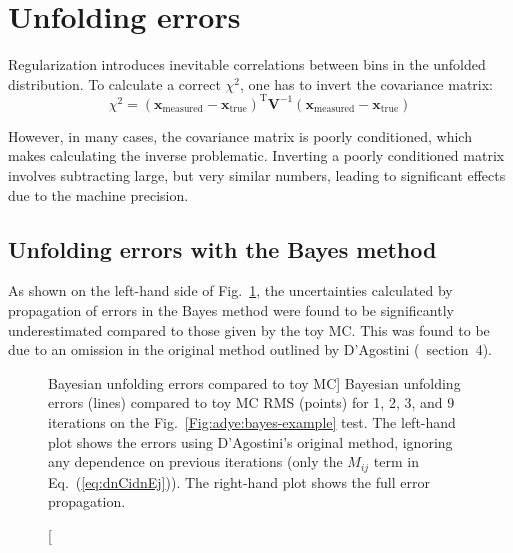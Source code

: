 \documentclass{cernrep}
\begin{document}
\section{Unfolding errors}

Regularization introduces inevitable correlations between bins in the unfolded distribution.
To calculate a correct $\chi^2$, one has to invert the covariance matrix:
\begin{equation}
\chi^2 = (\mathbf{x}_{\mathrm{measured}} - \mathbf{x}_{\mathrm{true}})^{\mathrm{T}} \mathbf{V}^{-1}
         (\mathbf{x}_{\mathrm{measured}} - \mathbf{x}_{\mathrm{true}})
\end{equation}

However, in many cases, the covariance matrix is poorly conditioned,
which makes calculating the inverse problematic.
Inverting a poorly conditioned matrix involves subtracting large, but
very similar numbers, leading to significant effects due to the
machine precision.

\subsection{Unfolding errors with the Bayes method}

As shown on the left-hand side of Fig.~\ref{fig:bayes_errors},
the uncertainties calculated by propagation of errors in the Bayes method
were found to be significantly underestimated compared to those given by the toy MC.
This was found to be due to an omission in the original method
outlined by D'Agostini (\cite{D'Agostini:1994zf}~section~4).%
\begin{figure}
%
\caption
[Bayesian unfolding errors compared to toy MC]%
{Bayesian unfolding errors (lines) compared to toy MC RMS (points) for 1, 2, 3, and 9 iterations
on the Fig.~\ref{Fig:adye:bayes-example} test.
The left-hand plot shows the errors using D'Agostini's original method,
ignoring any dependence on previous iterations (only the $M_{ij}$ term in Eq.~(\ref{eq:dnCidnEj})).
The right-hand plot shows the full error propagation.}%
\label{fig:bayes_errors}%
\end{figure}
\end{document}
